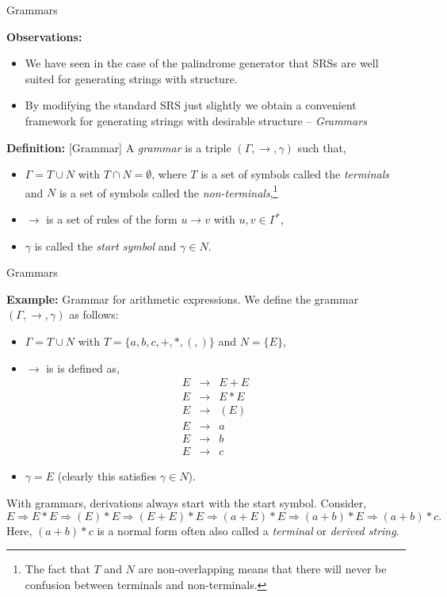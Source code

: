 \documentclass{beamer}
\begin{document}
\begin{frame}[fragile]{Grammars}

\small
{\bf Observations:}
\begin{itemize}
\item We have seen in the case of the palindrome generator that SRSs are well suited for generating strings with 
structure.
\item By modifying the standard SRS just slightly we obtain a convenient framework for generating strings
with desirable structure -- {\em Grammars}
\end{itemize}

\vspace{.2in}

{\bf Definition:} [Grammar] A {\em grammar} is a triple $(\Gamma,\rightarrow,\gamma)$ such that,
\begin{itemize}
\item $\Gamma = T \cup N$ with $T\cap N = \emptyset$, where $T$ is a set of symbols called the {\em terminals} and $N$ is a set of symbols
called the {\em non-terminals},\footnote{The fact that $T$ and $N$ are non-overlapping means
that there will never be confusion between terminals and non-terminals.}
\item $\rightarrow$ is a set of rules of the form $u \rightarrow v$ with $u,v\in\Gamma^*$,
\item $\gamma$ is called the {\em start symbol} and $\gamma\in N$.
\end{itemize}
\end{frame}

\begin{frame}[fragile]{Grammars}

\small
{\bf Example:} Grammar for arithmetic expressions.  We define the grammar $(\Gamma, \rightarrow, \gamma)$ as follows:
\begin{itemize}
\item $\Gamma = T \cup N$ with $T = \{ a, b, c, +, *, (, )\}$ and $N=\{ E \}$,
\item $\rightarrow$ is is defined as,
{\scriptsize
\[
\begin{array}{rcl}
E & \rightarrow & E + E \\
E & \rightarrow & E * E \\
E & \rightarrow & ( E )\\
E & \rightarrow & a\\
E & \rightarrow & b\\
E & \rightarrow & c
\end{array}
\]
}
\item $\gamma = E$ (clearly this satisfies $\gamma\in N$).
\end{itemize}
With grammars, derivations always start with the start symbol. Consider,
\[
E\Rightarrow E * E \Rightarrow ( E ) * E \Rightarrow ( E + E ) * E \Rightarrow (a + E) * E \Rightarrow (a + b) * E
\Rightarrow (a + b) * c.
\]
Here, $(a+b)*c$ is a normal form often also called a {\em terminal} or {\em derived string}.

\end{frame}
\end{document}
